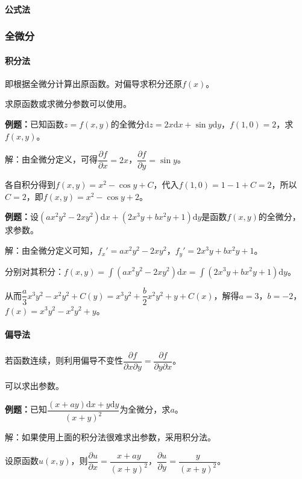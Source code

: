 \documentclass[UTF8, 12pt]{ctexart}
\begin{document}
\paragraph{公式法} \leavevmode \medskip

\subsubsection{全微分}

\paragraph{积分法} \leavevmode \medskip

即根据全微分计算出原函数。对偏导求积分还原$f(x)$。

求原函数或求微分参数可以使用。

\textbf{例题：}已知函数$z=f(x,y)$的全微分$\textrm{d}z=2x\textrm{d}x+\sin y\textrm{d}y$，$f(1,0)=2$，求$f(x,y)$。

解：由全微分定义，可得$\dfrac{\partial f}{\partial x}=2x$，$\dfrac{\partial f}{\partial y}=\sin y$。

各自积分得到$f(x,y)=x^2-\cos y+C$，代入$f(1,0)=1-1+C=2$，所以$C=2$，即$f(x,y)=x^2-\cos y+2$。

\textbf{例题：}设$(ax^2y^2-2xy^2)\textrm{d}x+(2x^3y+bx^2y+1)\textrm{d}y$是函数$f(x,y)$的全微分，求参数。

解：由全微分定义可知，$f_x'=ax^2y^2-2xy^2$，$f_y'=2x^3y+bx^2y+1$。

分别对其积分：$f(x,y)=\int(ax^2y^2-2xy^2)\textrm{d}x=\int(2x^3y+bx^2y+1)\textrm{d}y$。

从而$\dfrac{a}{3}x^3y^2-x^2y^2+C(y)=x^3y^2+\dfrac{b}{2}x^2y^2+y+C(x)$，解得$a=3$，$b=-2$，$f(x)=x^3y^2-x^2y^2+y$。

\paragraph{偏导法} \leavevmode \medskip

若函数连续，则利用偏导不变性$\dfrac{\partial f}{\partial x\partial y}=\dfrac{\partial f}{\partial y\partial x}$。

可以求出参数。

\textbf{例题：}已知$\dfrac{(x+ay)\textrm{d}x+y\textrm{d}y}{(x+y)^2}$为全微分，求$a$。

解：如果使用上面的积分法很难求出参数，采用积分法。

设原函数$u(x,y)$，则$\dfrac{\partial u}{\partial x}=\dfrac{x+ay}{(x+y)^2}$，$\dfrac{\partial u}{\partial y}=\dfrac{y}{(x+y)^2}$。
\end{document}
